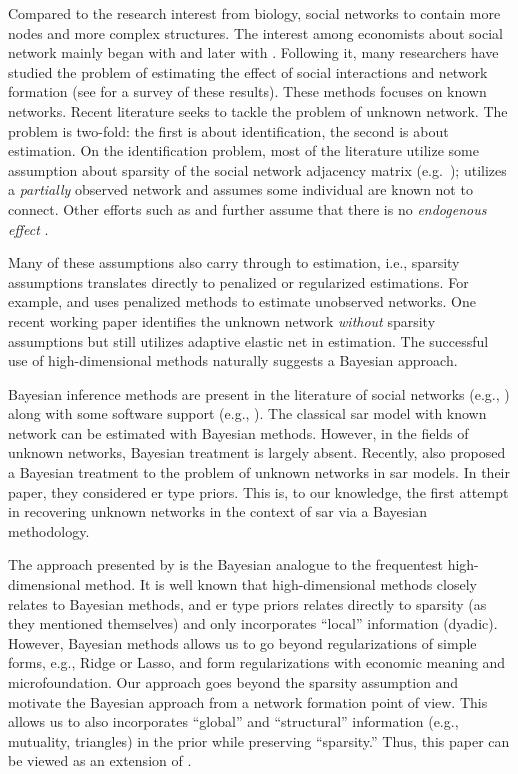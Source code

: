 \documentclass[a4paper]{article}
\begin{document}
Compared to the research interest from biology,
social networks to contain more nodes and more complex structures.
The interest among economists about social network mainly began with \cite{ord-1975} and later with \cite{manski-1993}.
Following it, many researchers have studied the problem of estimating the effect of social interactions
and network formation (see \cite{anselin-2009} for a survey of these results).
These methods focuses on known networks.
Recent literature seeks to tackle the problem of unknown network.
The problem is two-fold: the first is about identification, the second is about estimation.
On the identification problem,
most of the literature utilize some assumption about sparsity of the social network adjacency matrix
(e.g.\ \cite{rose-2017});
\cite{blume-2015} utilizes a \emph{partially} observed network and assumes some individual are known not to connect.
Other efforts such as \cite{bonaldi-2015} and \cite{manresa-2016}
further assume that there is no \emph{endogenous effect} \parencite{manski-1993}.

Many of these assumptions also carry through to estimation,
i.e., sparsity assumptions translates directly to penalized or regularized estimations.
For example, \cite{lam-2020} and \cite{meinshausen-2006} uses penalized methods to estimate unobserved networks.
One recent working paper \cite{de_paula-2023} identifies the unknown network \emph{without} sparsity assumptions
but still utilizes adaptive elastic net \parencite{caner-zhang-2014} in estimation.
The successful use of high-dimensional methods naturally suggests a Bayesian approach.

Bayesian inference methods are present in the literature of social networks (e.g., \cite{hsieh-2018})
along with some software support (e.g., \cite{caimo-friel-2014}).
The classical \gls{sar} model with known network can be estimated with Bayesian methods.
However, in the fields of unknown networks, Bayesian treatment is largely absent.
Recently, \cite{krisztin-piribauer-2022} also proposed a Bayesian treatment
to the problem of unknown networks in \gls{sar} models.
In their paper, they considered \gls{er} type priors.
This is, to our knowledge, the first attempt in recovering unknown networks in the context of \gls{sar} via a Bayesian methodology.

The approach presented by \cite{krisztin-piribauer-2022} is the Bayesian analogue to the frequentest high-dimensional method.
It is well known that high-dimensional methods closely relates to Bayesian methods,
and \gls{er} type priors relates directly to sparsity (as they mentioned themselves)
and only incorporates ``local'' information (dyadic).
However, Bayesian methods allows us to go beyond regularizations of simple forms,
e.g., Ridge or Lasso,
and form regularizations with economic meaning and microfoundation.
Our approach goes beyond the sparsity assumption and motivate the Bayesian approach from a network formation point of view.
This allows us to also incorporates ``global'' and ``structural'' information (e.g., mutuality, triangles) in the prior
while preserving ``sparsity.''
Thus, this paper can be viewed as an extension of \cite{krisztin-piribauer-2022}.
\end{document}
